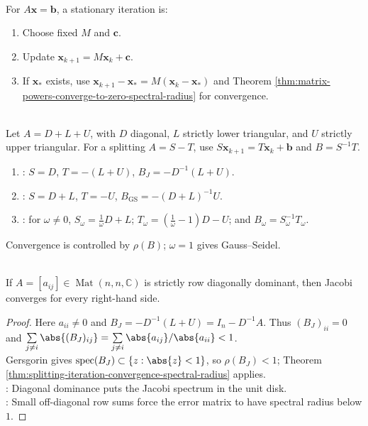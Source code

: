 \begin{method} \label{meth:stationary-iterative-method} \\
For $A\mathbf{x}=\mathbf{b}$, a stationary iteration is:
\begin{enumerate}[label=(\roman*)]
\setlength{\itemsep}{0pt}
\item Choose fixed $M$ and $\mathbf{c}$.
\item Update $\mathbf{x}_{k+1}=M\mathbf{x}_k+\mathbf{c}$.
\item If $\mathbf{x}_*$ exists, use $\mathbf{x}_{k+1}-\mathbf{x}_*=M(\mathbf{x}_k-\mathbf{x}_*)$ and Theorem \ref{thm:matrix-powers-converge-to-zero-spectral-radius} for convergence.
\end{enumerate}
\end{method}

\begin{method} \label{meth:jacobi-gauss-seidel-sor-splittings} \\
Let $A=D+L+U$, with $D$ diagonal, $L$ strictly lower triangular, and $U$ strictly upper triangular. For a splitting $A=S-T$, use $S\mathbf{x}_{k+1}=T\mathbf{x}_k+\mathbf{b}$ and $B=S^{-1}T$.
\begin{enumerate}[label=(\roman*)]
\setlength{\itemsep}{0pt}
\item {}: $S=D$, $T=-(L+U)$, $B_J=-D^{-1}(L+U)$.
\item {}: $S=D+L$, $T=-U$, $B_{\operatorname{GS}}=-(D+L)^{-1}U$.
\item {}: for $\omega\neq0$, $S_\omega=\frac1\omega D+L$; $T_\omega=\left(\frac1\omega-1\right)D-U$; and $B_\omega=S_\omega^{-1}T_\omega$.
\end{enumerate}
Convergence is controlled by $\rho(B)$; $\omega=1$ gives Gauss--Seidel.
\end{method}

\begin{corollary} \label{cor:strict-diagonal-dominance-jacobi-convergence} \\
If $A=[a_{ij}]\in\operatorname{Mat}(n,n,\mathbb{C})$ is strictly row diagonally dominant, then Jacobi converges for every right-hand side.
\begin{proof}
Here $a_{ii}\neq0$ and $B_J=-D^{-1}(L+U)=I_n-D^{-1}A$. Thus $(B_J)_{ii}=0$ and $\sum\limits_{j\neq i}\abs{(B_J)_{ij}}=\sum\limits_{j\neq i}\abs{a_{ij}}/\abs{a_{ii}}<1$.\\
Gersgorin gives $\operatorname{spec}(B_J)\subset\{z:\abs{z}<1\}$, so $\rho(B_J)<1$; Theorem \ref{thm:splitting-iteration-convergence-spectral-radius} applies.\\
: Diagonal dominance puts the Jacobi spectrum in the unit disk.\\
: Small off-diagonal row sums force the error matrix to have spectral radius below $1$.
\end{proof}
\end{corollary}

